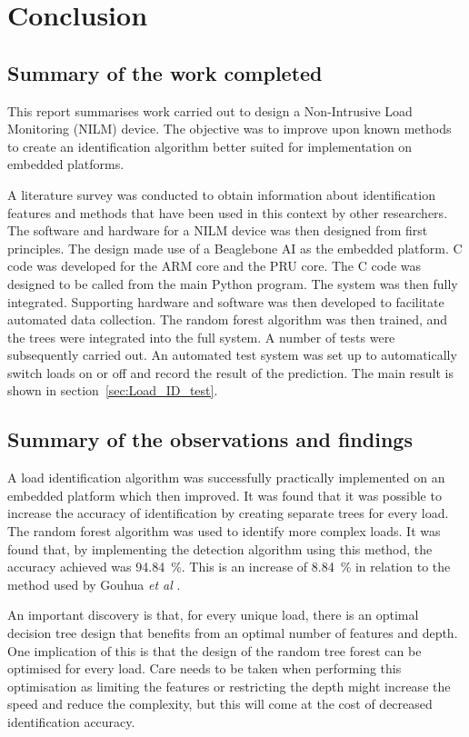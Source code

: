 
\section{Conclusion}

\subsection{Summary of the work completed}
This report summarises work carried out to design a Non-Intrusive Load Monitoring (NILM) device. The objective was to improve upon known methods to create an identification algorithm better suited for implementation on embedded platforms.
\par
A literature survey was conducted to obtain information about identification features and methods that have been used in this context by other researchers. The software and hardware for a NILM device was then designed from first principles. The design made use of a Beaglebone AI as the embedded platform. C code was developed for the ARM core and the PRU core. The C code was designed to be called from the main Python program. The system was then fully integrated. Supporting hardware and software was then developed to facilitate automated data collection. The random forest algorithm was then trained, and the trees were integrated into the full system. A number of tests were subsequently carried out. An automated test system was set up to automatically switch loads on or off and record the result of the prediction. The main result is shown in section~\ref{sec:Load_ID_test}.
\subsection{Summary of the observations and findings}
A load identification algorithm was successfully practically implemented on an embedded platform which then improved. It was found that it was possible to increase the accuracy of identification by creating separate trees for every load. The random forest algorithm was used to identify more complex loads. It was found that, by implementing the detection algorithm using this method, the accuracy
achieved was \qty{94.84}{\percent}. This is an increase of \qty{8.84}{\percent} in relation to the method used by Gouhua \emph{et al} \cite{RN39}.
\par
An important discovery is that, for every unique load, there is an optimal decision tree design that benefits from an optimal number of features and depth. One implication of this is that the design of the random tree forest can be optimised for every load. Care needs to be taken when performing this optimisation as limiting the features or restricting the depth might increase the speed and reduce the complexity, but this will come at the cost of decreased identification accuracy. 


